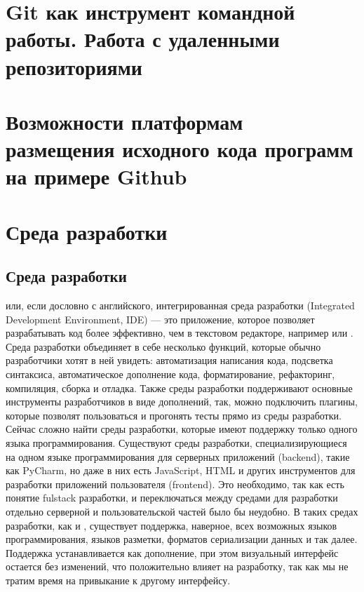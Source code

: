 \documentclass[letterpaper,10pt,russian]{sphinxmanual}
\begin{document}
\chapter{Git как инструмент командной работы. Работа с удаленными репозиториями}
\label{\detokenize{index:id3}}

\chapter{Возможности платформам размещения исходного кода программ на примере Github}
\label{\detokenize{index:github}}

\chapter{Среда разработки}
\label{\detokenize{index:id4}}
\sphinxstepscope


\section{Среда разработки}
\label{\detokenize{educational_materials/ide/content:id1}}\label{\detokenize{educational_materials/ide/content::doc}}
\sphinxAtStartPar
{} или, если дословно с английского, интегрированная среда разработки (Integrated Development Environment, IDE) — это приложение, которое позволяет разрабатывать код более эффективно, чем в текстовом редакторе, например  или . Среда разработки объединяет в себе несколько функций, которые обычно разработчики хотят в ней увидеть: автоматизация написания кода, подсветка синтаксиса, автоматическое дополнение кода, форматирование, рефакторинг, компиляция, сборка и отладка. Также среды разработки поддерживают основные инструменты разработчиков в виде дополнений, так, можно подключить плагины, которые позволят пользоваться  и прогонять тесты прямо из среды разработки. Сейчас сложно найти среды разработки, которые имеют поддержку только одного языка программирования. Существуют среды разработки, специализирующиеся на одном языке программирования для серверных приложений (backend), такие как PyCharm, но даже в них есть  JavaScript, HTML и других инструментов для разработки приложений пользователя (frontend). Это необходимо, так как есть понятие fulstack разработки, и переключаться между средами для разработки отдельно серверной и пользовательской частей было бы неудобно. В таких средах разработки, как  и , существует поддержка, наверное, всех возможных языков программирования, языков разметки, форматов сериализации данных и так далее. Поддержка устанавливается как дополнение, при этом визуальный интерфейс остается без изменений, что положительно влияет на разработку, так как мы не тратим время на привыкание к другому интерфейсу.
\end{document}
